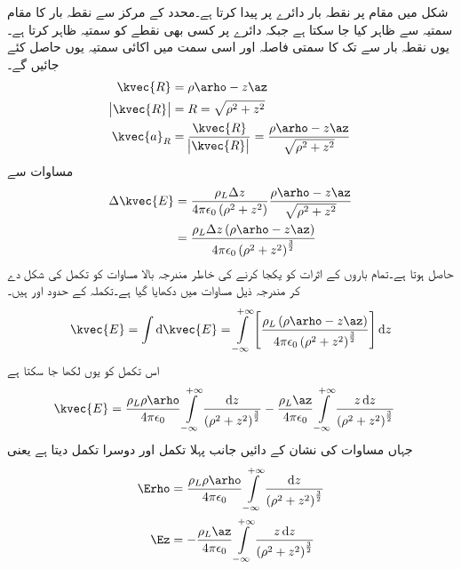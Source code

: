 شکل  میں مقام  پر نقطہ بار   دائرے پر  پیدا کرتا ہے۔محدد کے مرکز سے نقطہ بار کا مقام سمتیہ  سے ظاہر کیا جا سکتا ہے جبکہ دائرے پر کسی بھی نقطے  کو سمتیہ  ظاہر کرتا ہے۔یوں نقطہ بار سے   تک کا سمتی فاصلہ اور اسی سمت میں اکائی سمتیہ یوں حاصل کئے جائیں گے۔
\begin{align*}
\kvec{R}&=\rho \arho-z\az\\
\abs{\kvec{R}}&=R=\sqrt{\rho^2+z^2}\\
\kvec{a}_R&=\frac{\kvec{R}}{\abs{\kvec{R}}}=\frac{\rho \arho-z\az}{\sqrt{\rho^2+z^2}}
\end{align*}
مساوات  سے
\begin{align*}
\Delta \kvec{E}&=\frac{\rho_L \Delta z}{4 \pi \epsilon_0 \left(\rho^2+z^2 \right)} \frac{\rho \arho-z\az}{\sqrt{\rho^2+z^2}}\\
&=\frac{\rho_L \Delta z \left(\rho \arho-z\az \right)}{4 \pi \epsilon_0\left(\rho^2+z^2 \right)^{\frac{3}{2}}}
\end{align*}
حاصل ہوتا ہے۔تمام باروں کے اثرات کو یکجا کرنے کی خاطر مندرجہ بالا مساوات کو تکمل کی شکل دے کر مندرجہ ذیل مساوات میں دکھایا گیا ہے۔تکملہ کے حدود  اور   ہیں۔
\begin{align}
\kvec{E}=\int \dif  \kvec{E}=\int\limits_{-\infty}^{+\infty} \left[\frac{\rho_L \left(\rho \arho-z\az \right)}{4 \pi \epsilon_0\left(\rho^2+z^2 \right)^{\frac{3}{2}}}\right] \dif z
\end{align}
اس تکمل کو یوں لکھا جا سکتا ہے
\begin{align}\label{مساوات_کولمب_لامحدود_لکیر_بار_کا_میدان}
\kvec{E}&=\frac{\rho_L \rho \arho}{4 \pi \epsilon_0}\int\limits_{-\infty}^{+\infty} \frac{\dif z }{\left(\rho^2+z^2 \right)^{\frac{3}{2}}} -\frac{\rho_L \az}{4 \pi \epsilon_0}\int\limits_{-\infty}^{+\infty} \frac{z \dif z}{\left(\rho^2+z^2 \right)^{\frac{3}{2}}}
\end{align}
جہاں مساوات کی نشان کے دائیں جانب پہلا تکمل  \Erho اور دوسرا تکمل \Ez دیتا ہے  یعنی
\begin{gather}
\begin{aligned}\label{مساوات_کولمب_رداسی_اور_عمودی_برقی_میدان}
\Erho&=\frac{\rho_L \rho \arho}{4 \pi \epsilon_0}\int\limits_{-\infty}^{+\infty} \frac{\dif z }{\left(\rho^2+z^2 \right)^{\frac{3}{2}}}\\
\Ez&=-\frac{\rho_L \az}{4 \pi \epsilon_0}\int\limits_{-\infty}^{+\infty} \frac{z \dif z}{\left(\rho^2+z^2 \right)^{\frac{3}{2}}}
\end{aligned}
\end{gather}


